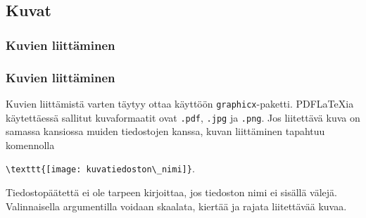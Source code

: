 \subsection{Kuvat}
\subsubsection{Kuvien liittäminen}
\begin{frame}[fragile]
    \frametitle{Kuvien liittäminen}
    Kuvien liittämistä varten täytyy ottaa käyttöön \verb-graphicx--paketti. 
    \vaihto
    PDFLaTeXia käytettäessä sallitut kuvaformaatit ovat \verb-.pdf-, \verb-.jpg- ja \verb-.png-. 
    \vaihto
    Jos liitettävä kuva on samassa kansiossa muiden tiedostojen kanssa, kuvan liittäminen tapahtuu komennolla
    \begin{framed}
        \centering
        \verb-\texttt{[image: kuvatiedoston\_nimi]}-. 
    \end{framed}
    Tiedostopäätettä ei ole tarpeen kirjoittaa, jos tiedoston nimi ei sisällä välejä.
    \vaihto
    Valinnaisella argumentilla voidaan skaalata, kiertää ja rajata liitettävää kuvaa. 
\end{frame}
